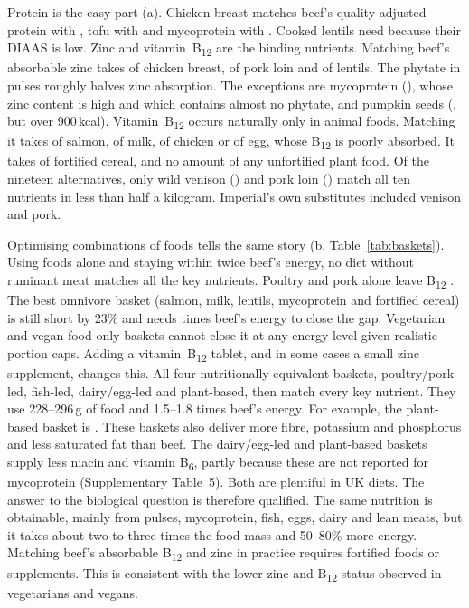 \documentclass[10pt]{article}
\begin{document}
Protein is the easy part (a). Chicken breast matches beef's quality-adjusted
protein with \EqChickenProtein{}, tofu with \EqTofuProtein{} and mycoprotein with \EqMycoproteinProtein{}.
Cooked lentils need \EqLentilsProtein{} because their DIAAS is low\cite{nosworthy2017}. Zinc and
vitamin~B\textsubscript{12} are the binding nutrients. Matching beef's absorbable zinc takes \EqChickenZinc{}
of chicken breast, \EqPorkZinc{} of pork loin and \EqLentilsZinc{} of lentils. The phytate in pulses
roughly halves zinc absorption\cite{efsa2014zinc}. The exceptions are mycoprotein (\EqMycoproteinZinc{}),
whose zinc content is high and which contains almost no phytate\cite{finnigan2019,mayerlabba2022},
and pumpkin seeds (\EqSeedsZinc{}, but over 900\,kcal). Vitamin~B\textsubscript{12} occurs naturally only in
animal foods. Matching it takes \EqSalmonBtwelve{} of salmon, \EqMilkBtwelve{} of milk, \EqChickenBtwelve{} of
chicken or \EqEggBtwelve{} of egg, whose B\textsubscript{12} is poorly absorbed\cite{watanabe2007}. It takes
\EqCerealBtwelve{} of fortified cereal, and no amount of any unfortified plant food. Of the nineteen
alternatives, only wild venison (\EqVenisonAll{}) and pork loin (\EqPorkAll{}) match all ten nutrients in
less than half a kilogram. Imperial's own substitutes included venison and pork\cite{imperial2026progress}.

Optimising combinations of foods tells the same story (b, Table~\ref{tab:baskets}).
Using foods alone and staying within twice beef's energy, no diet without ruminant meat matches all
the key nutrients. Poultry and pork alone leave B\textsubscript{12} \BasketMeatSwapShort{}. The best omnivore
basket (salmon, milk, lentils, mycoprotein and fortified cereal) is still short by 23\% and needs
\MinEnergyOmnivore{} times beef's energy to close the gap. Vegetarian and vegan food-only baskets cannot
close it at any energy level given realistic portion caps. Adding a vitamin~B\textsubscript{12} tablet, and
in some cases a small zinc supplement, changes this. All four nutritionally equivalent baskets,
poultry/pork-led, fish-led, dairy/egg-led and plant-based, then match every key nutrient. They use
228--296\,g of food and 1.5--1.8 times beef's energy. For example, the plant-based basket is
\BasketEqVeganDesc{}. These baskets also deliver more fibre, potassium and phosphorus and less saturated fat
than beef. The dairy/egg-led and plant-based baskets supply less niacin and vitamin
B\textsubscript{6}, partly because these are not reported for mycoprotein (Supplementary Table~5).
Both are plentiful in UK diets. The answer to the biological question is therefore qualified. The same
nutrition is obtainable, mainly from pulses, mycoprotein, fish, eggs, dairy and lean meats, but it
takes about two to three times the food mass and 50--80\% more energy. Matching beef's absorbable
B\textsubscript{12} and zinc in practice requires fortified foods or supplements. This is consistent with
the lower zinc and B\textsubscript{12} status observed in vegetarians and vegans\cite{foster2013,neufingerl2022}.
\end{document}
